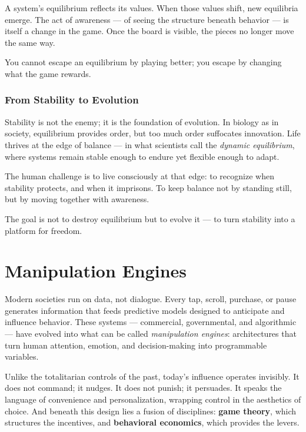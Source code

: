 \documentclass[12pt,twoside]{book}
\begin{document}
A system’s equilibrium reflects its values.  
When those values shift, new equilibria emerge.  
The act of awareness — of seeing the structure beneath behavior — is itself a change in the game.  
Once the board is visible, the pieces no longer move the same way.\\

\begin{keyidea}
You cannot escape an equilibrium by playing better; you escape by changing what the game rewards.
\end{keyidea}

\subsection*{From Stability to Evolution}
Stability is not the enemy; it is the foundation of evolution.  
In biology as in society, equilibrium provides order, but too much order suffocates innovation.  
Life thrives at the edge of balance — in what scientists call the \emph{dynamic equilibrium}, where systems remain stable enough to endure yet flexible enough to adapt.  

The human challenge is to live consciously at that edge:  
to recognize when stability protects, and when it imprisons.  
To keep balance not by standing still, but by moving together with awareness.  \\

\begin{keyidea}
The goal is not to destroy equilibrium but to evolve it --- to turn stability into a platform for freedom.
\end{keyidea}

\chapter{Manipulation Engines}

Modern societies run on data, not dialogue.  
Every tap, scroll, purchase, or pause generates information that feeds predictive models designed to anticipate and influence behavior.  
These systems --- commercial, governmental, and algorithmic --- have evolved into what can be called \emph{manipulation engines}: architectures that turn human attention, emotion, and decision-making into programmable variables.  

Unlike the totalitarian controls of the past, today’s influence operates invisibly.  
It does not command; it nudges.  
It does not punish; it persuades.  
It speaks the language of convenience and personalization, wrapping control in the aesthetics of choice.  
And beneath this design lies a fusion of disciplines: \textbf{game theory}, which structures the incentives, and \textbf{behavioral economics}, which provides the levers.
\end{document}
